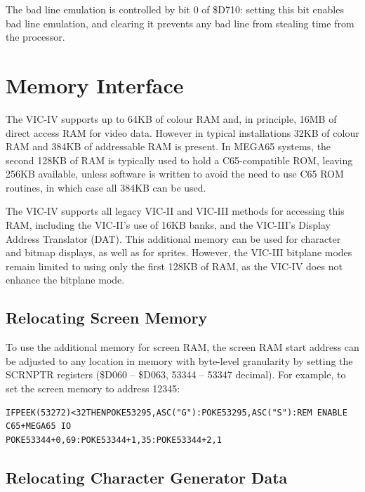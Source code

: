 The bad line emulation is controlled by bit 0 of \$D710: setting this bit enables bad line emulation, and clearing it prevents
any bad line from stealing time from the processor.


\section{Memory Interface}

The VIC-IV supports up to 64KB of colour RAM and, in principle, 16MB of direct access RAM for video data.  However in typical installations
32KB of colour RAM and 384KB of addressable RAM is present. In MEGA65 systems, the second 128KB of RAM is typically used to hold a C65-compatible ROM, leaving 256KB available, unless software is written to avoid the need to use C65 ROM routines, in which case all 384KB can be used.

The VIC-IV supports all legacy VIC-II and VIC-III methods for accessing this RAM, including the VIC-II's use of 16KB banks, and the VIC-III's Display Address Translator (DAT).  This additional memory can be used for character and bitmap displays, as well as for sprites.  However, the VIC-III bitplane modes remain limited to using only the first 128KB of RAM, as the VIC-IV does not enhance the bitplane mode.

\subsection{Relocating Screen Memory}

To use the additional memory for screen RAM, the screen RAM start address can be adjusted to any location in memory with byte-level granularity by setting the SCRNPTR registers (\$D060 -- \$D063, 53344 -- 53347 decimal).  For example, to set the screen memory to address 12345:

\begin{tcolorbox}[colback=black,coltext=white]
\verbatimfont{\codefont}
\begin{verbatim}
IFPEEK(53272)<32THENPOKE53295,ASC("G"):POKE53295,ASC("S"):REM ENABLE C65+MEGA65 IO
POKE53344+0,69:POKE53344+1,35:POKE53344+2,1
\end{verbatim}
\end{tcolorbox}

\subsection{Relocating Character Generator Data}


